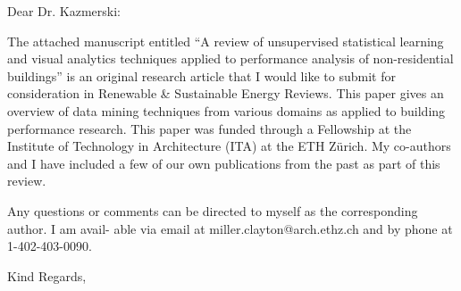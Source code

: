 \documentclass[english]{ethbrief3}
\begin{document}
\opening{Dear Dr. Kazmerski:}

The attached manuscript entitled “A review of unsupervised statistical learning and visual analytics techniques applied to performance analysis of non-residential buildings” is an original research article that I would like to submit for consideration in Renewable \& Sustainable Energy Reviews. This paper gives an overview of data mining techniques from various domains as applied to building performance research. This paper was funded through a Fellowship at the Institute of Technology in Architecture (ITA) at the ETH Z\"urich. My co-authors and I have included a few of our own publications from the past as part of this review.

Any questions or comments can be directed to myself as the corresponding author. I am avail-
able via email at miller.clayton@arch.ethz.ch and by phone at 1-402-403-0090.

\closing{Kind Regards,}





    
\end{document}
